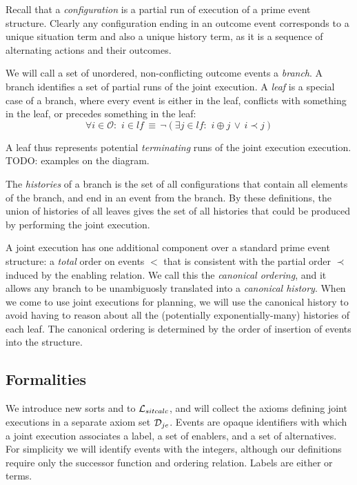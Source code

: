 Recall that a \emph{configuration} is a partial run of execution of
a prime event structure. Clearly any configuration ending in an outcome
event corresponds to a unique situation term and also a unique history
term, as it is a sequence of alternating actions and their outcomes.

We will call a set of unordered, non-conflicting outcome events a\emph{
branch}. A branch identifies a set of partial runs of the joint execution.
A \emph{leaf} is a special case of a branch, where every event is
either in the leaf, conflicts with something in the leaf, or precedes
something in the leaf: \[
\forall i\in\mathcal{O}:\,\, i\in lf\,\equiv\,\neg(\exists j\in lf:\,\, i\oplus j\,\vee\, i\prec j)\]


A leaf thus represents potential \emph{terminating} runs of the joint
execution execution. TODO: examples on the diagram.

The \emph{histories} of a branch is the set of all configurations
that contain all elements of the branch, and end in an event from
the branch. By these definitions, the union of histories of all leaves
gives the set of all histories that could be produced by performing
the joint execution.

A joint execution has one additional component over a standard prime
event structure: a \emph{total} order on events $<$ that is consistent
with the partial order $\prec$ induced by the enabling relation.
We call this the \emph{canonical ordering}, and it allows any branch
to be unambiguosly translated into a \emph{canonical history}. When
we come to use joint executions for planning, we will use the canonical
history to avoid having to reason about all the (potentially exponentially-many)
histories of each leaf. The canonical ordering is determined by the
order of insertion of events into the structure.


\subsection{Formalities}

We introduce new sorts and  to $\mathcal{L}_{sitcalc}$,
and will collect the axioms defining joint executions in a separate
axiom set $\mathcal{D}_{je}$. Events are opaque identifiers with which a
joint execution associates a label, a set of enablers, and a set of
alternatives. For simplicity we will identify events with the integers,
although our definitions require only the successor function and ordering
relation. Labels are either  or  terms.

